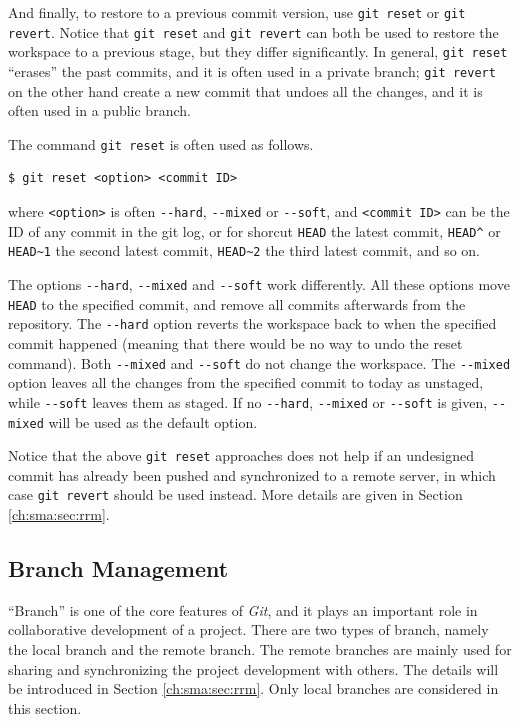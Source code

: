 And finally, to restore to a previous commit version, use \verb|git reset| or \verb|git revert|. Notice that \verb|git reset| and \verb|git revert| can both be used to restore the workspace to a previous stage, but they differ significantly. In general, \verb|git reset| ``erases'' the past commits, and it is often used in a private branch; \verb|git revert| on the other hand create a new commit that undoes all the changes, and it is often used in a public branch.

The command \verb|git reset| is often used as follows.
\begin{lstlisting}
$ git reset <option> <commit ID>
\end{lstlisting}
where \verb|<option>| is often \verb|--hard|, \verb|--mixed| or \verb|--soft|, and \verb|<commit ID>| can be the ID of any commit in the git log, or for shorcut \verb|HEAD| the latest commit, \verb|HEAD^| or \verb|HEAD~1| the second latest commit, \verb|HEAD~2| the third latest commit, and so on.

The options \verb|--hard|, \verb|--mixed| and \verb|--soft| work differently. All these options move \verb|HEAD| to the specified commit, and remove all commits afterwards from the repository. The \verb|--hard| option reverts the workspace back to when the specified commit happened (meaning that there would be no way to undo the reset command). Both \verb|--mixed| and \verb|--soft| do not change the workspace. The \verb|--mixed| option leaves all the changes from the specified commit to today as unstaged, while \verb|--soft| leaves them as staged. If no \verb|--hard|, \verb|--mixed| or \verb|--soft| is given, \verb|--mixed| will be used as the default option.

Notice that the above \verb|git reset| approaches does not help if an undesigned commit has already been pushed and synchronized to a remote server, in which case \verb|git revert| should be used instead. More details are given in Section \ref{ch:sma:sec:rrm}.

\subsection{Branch Management}

``Branch'' is one of the core features of \textit{Git}, and it plays an important role in collaborative development of a project. There are two types of branch, namely the local branch and the remote branch. The remote branches are mainly used for sharing and synchronizing the project development with others. The details will be introduced in Section \ref{ch:sma:sec:rrm}. Only local branches are considered in this section.

